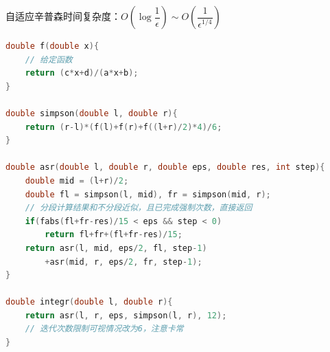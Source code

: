 自适应辛普森时间复杂度：$O\left(\log \dfrac{1}{\epsilon}\right) \sim O\left(\dfrac{1}{\epsilon^{1/4}}\right)$
\begin{lstlisting}[language = C++]
double f(double x){
    // 给定函数
    return (c*x+d)/(a*x+b);
}

double simpson(double l, double r){
    return (r-l)*(f(l)+f(r)+f((l+r)/2)*4)/6;
}

double asr(double l, double r, double eps, double res, int step){
    double mid = (l+r)/2;
    double fl = simpson(l, mid), fr = simpson(mid, r);
    // 分段计算结果和不分段近似，且已完成强制次数，直接返回
    if(fabs(fl+fr-res)/15 < eps && step < 0)
        return fl+fr+(fl+fr-res)/15;
    return asr(l, mid, eps/2, fl, step-1)
        +asr(mid, r, eps/2, fr, step-1);
}

double integr(double l, double r){
    return asr(l, r, eps, simpson(l, r), 12);
    // 迭代次数限制可视情况改为6，注意卡常
}
\end{lstlisting}